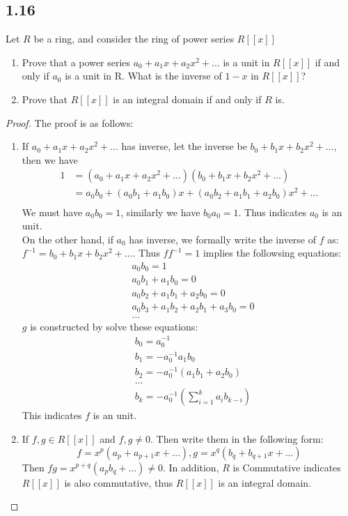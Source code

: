 \documentclass[a4paper, pdf, 12pt]{article}
\begin{document}
\subsection*{1.16}
Let $R$ be a ring, and consider the ring of power series $R[[x]]$
\begin{enumerate} [leftmargin=0cm,itemindent=.2cm,labelwidth=\itemindent,labelsep=0.2cm,align=right,label=(\roman*)]
  \item Prove that a power series $a_0+ a_1x + a_2x^2+ \ldots$ is a unit in $R[[x]]$ if and only if
  $a_0$ is a unit in R. What is the inverse of $1−x$ in $R[[x]]$?
  \item Prove that $R[[x]]$ is an integral domain if and only if $R$ is.
\end{enumerate}
\begin{proof}
  The proof is as follows:
  \begin{enumerate} [leftmargin=0cm,itemindent=.2cm,labelwidth=\itemindent,labelsep=0.2cm,align=right,label=(\roman*)]
    \item If $a_0+ a_1x + a_2x^2+ \ldots$ has inverse, let the inverse be $b_0 + b_1x + b_2x^2 + \ldots$, then we have 
    $$
    \begin{aligned}
    1 &= (a_0+ a_1x + a_2x^2+ \ldots)(b_0 + b_1x + b_2x^2 + \ldots)\\
    &= a_0b_0 + (a_0b_1 + a_1b_0)x +(a_0b_2 + a_1b_1 + a_2b_0)x^2+\ldots\\
    \end{aligned}
    $$
    We must have $a_0b_0=1$, similarly we have $b_0a_0=1$. Thus indicates $a_0$ is an unit.\\
    \noindent
    On the other hand, if $a_0$ has inverse, we formally write the inverse of $f$ as:
    $f^{-1} = b_0 + b_1x + b_2x^{2} + \ldots$. Thus $ff^{-1} = 1$ implies the followsing 
    equations:
    $$
    \begin{aligned}
      &a_0b_0 = 1\\
      &a_0b_1 + a_1b_0 = 0\\
      &a_0b_2 + a_1b_1 + a_2b_0 = 0\\
      &a_0b_3 + a_1b_2 + a_2b_1 + a_3b_0 = 0\\
      &\ldots
    \end{aligned}
    $$
    $g$ is constructed by solve these equations:
    $$
    \begin{aligned}
      &b_0 = a_0^{-1}\\
      &b_1 = -a_0^{-1}a_1b_0\\
      &b_2 = -a_0^{-1}(a_1b_1 + a_2b_0)\\
      &\ldots\\
      &b_k = -a_0^{-1}(\sum_{i=1}^{k}a_{i}b_{k-i})
    \end{aligned}
    $$
    This indicates $f$ is an unit.

  \item If $f, g\in R[[x]]$ and $f, g\neq 0$. Then write them in the following form:
  $$
  f = x^{p}(a_p + a_{p+1}x + \ldots), g = x^{q}(b_q + b_{q+1}x + \ldots)
  $$
  Then $fg = x^{p+q}(a_pb_q + \ldots)\neq 0$. In addition, $R$ is Commutative indicates $R[[x]]$ is also
  commutative, thus $R[[x]]$ is an integral domain.
  \end{enumerate}
\end{proof}
\end{document}
